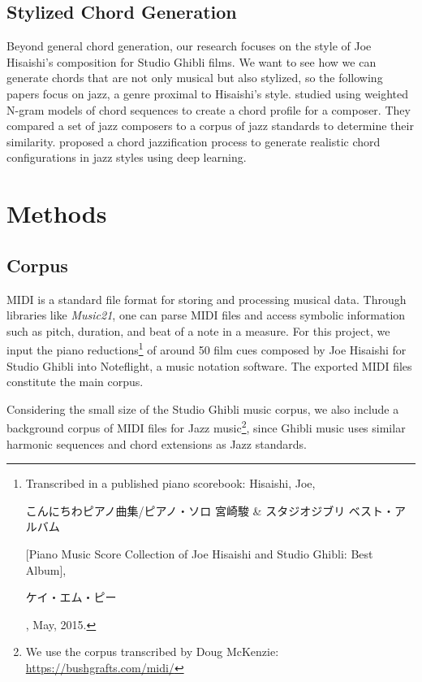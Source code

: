 \documentclass[11pt,a4paper]{article}
\begin{document}
\subsection{Stylized Chord Generation}
Beyond general chord generation, our research focuses on the style of Joe Hisaishi’s composition for Studio Ghibli films. We want to see how we can generate chords that are not only musical but also stylized, so the following papers focus on jazz, a genre proximal to Hisaishi’s style. \citet{ogihara2008} studied using weighted N-gram models of chord sequences to create a chord profile for a composer. They compared a set of jazz composers to a corpus of jazz standards to determine their similarity. \citet{chen2020} proposed a chord jazzification process to generate realistic chord configurations in jazz styles using deep learning. 

\section{Methods}
\subsection{Corpus}
MIDI is a standard file format for storing and processing musical data. Through libraries like \emph{Music21}, one can parse MIDI files and access symbolic information such as pitch, duration, and beat of a note in a measure. For this project, we input the piano reductions\footnote{Transcribed in a published piano scorebook: Hisaishi, Joe, 
\begin{CJK}{UTF8}{min}こんにちわピアノ曲集/ピアノ・ソロ 宮崎駿 \& スタジオジブリ ベスト・アルバム\end{CJK} [Piano Music Score Collection of Joe Hisaishi and Studio Ghibli: Best Album],\begin{CJK}{UTF8}{min}ケイ・エム・ピー\end{CJK}, May, 2015.} of around 50 film cues composed by Joe Hisaishi for Studio Ghibli into Noteflight, a music notation software. The exported MIDI files constitute the main corpus. 

Considering the small size of the Studio Ghibli music corpus, we also include a background corpus of MIDI files for Jazz music\footnote{We use the corpus transcribed by Doug McKenzie: \url{https://bushgrafts.com/midi/}}, since Ghibli music uses similar harmonic sequences and chord extensions as Jazz standards. 
\end{document}

